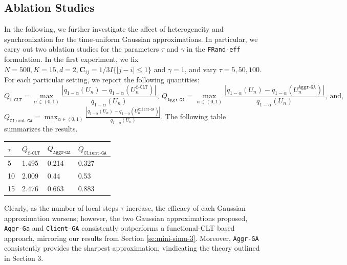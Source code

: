 \documentclass[a4paper,11pt]{article}
\numberwithin{equation}{section}
\theoremstyle{plain}
\theoremstyle{remark}
\begin{document}
\subsection{Ablation Studies}
In the following, we further investigate the affect of heterogeneity and synchronization for the time-uniform Gaussian approximations. In particular, we carry out two ablation studies for the parameters $\tau$ and $\gamma$ in the \texttt{FRand-eff} formulation.
In the first experiment, we fix $N=500, K=15, d=2, \mathbf{C}_{ij}=1/3 I\{|j-i|\leq 1\}$ and  $\gamma=1$, and vary $\tau=5, 50, 100$. For each particular setting, we report the following quantities:
\[ Q_{\texttt{f-CLT}} = \max_{\alpha \in (0,1)} \frac{|q_{1-\alpha}(U_n) - q_{1-\alpha}(U_n^{\texttt{f-CLT}})|}{q_{1-\alpha}(U_n)} , \ Q_{\texttt{Aggr-GA}} = \max_{\alpha \in (0,1)} \frac{|q_{1-\alpha}(U_n) - q_{1-\alpha}(U_n^{\texttt{Aggr-GA}})|}{q_{1-\alpha}(U_n)}, \ \text{and,} \]
$Q_{\texttt{Client-GA}} = \max_{\alpha \in (0,1)} \frac{|q_{1-\alpha}(U_n) - q_{1-\alpha}(U_n^{\texttt{Client-GA}})|}{q_{1-\alpha}(U_n)}$. The following table summarizes the results.  
\begin{table}[H]
\centering
\begin{tabular}{|l|l|l|l|}
\hline
$\tau$ & $Q_{\texttt{f-CLT}}$ & $Q_{\texttt{Aggr-GA}}$ & $Q_{\texttt{Client-GA}}$ \\\hline

5     & 1.495                & 0.214                                    & 0.327   \\\hline                
10     & 2.009                & 0.44                                     & 0.53                     \\\hline
15      & 2.476                & 0.663                                    & 0.883                    \\\hline
\end{tabular}
\end{table}
Clearly, as the number of local steps $\tau$ increase, the efficacy of each Gaussian approximation worsens; however, the two Gaussian approximations proposed, \texttt{Aggr-Ga} and \texttt{Client-GA} consistently outperforms a functional-CLT based approach, mirroring our results from Section \ref{se:mini-simu-3}. Moreover, \texttt{Aggr-GA} consistently provides the sharpest approximation, vindicating the theory outlined in Section 3. 
\end{document}
